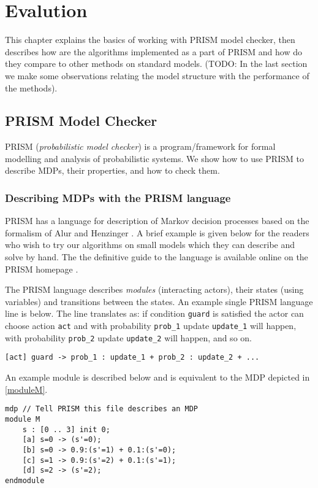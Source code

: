 \chapter{Evalution}
\label{ch_evaluation}

This chapter explains the basics of working with PRISM model checker,
then describes how are the algorithms implemented as a part of PRISM and
how do they compare to other methods on standard models.
(TODO: In the last section we make some observations relating the model
structure with the performance of the methods).

\section{PRISM Model Checker}

PRISM \parencite{prism}
({\em probabilistic model checker}) is a program/framework
for formal modelling and analysis of probabilistic systems.
We show how to use PRISM to describe MDPs, their properties,
and how to check them.

\subsection*{Describing MDPs with the PRISM language}
PRISM has a language for description of Markov decision processes
based on the formalism of Alur and Henzinger \parencite{ReactiveModules}.
A brief example is given below for the readers who wish to try our
algorithms on small models which they can describe and solve by hand.
The the definitive guide to the language is available online on the
PRISM homepage \parencite{prism_lang}.

The PRISM language describes {\em modules} (interacting actors),
their states (using variables) and transitions between the states.
An example single PRISM language line is below. The line translates as:
if condition \verb|guard| is satisfied the actor can choose action \verb|act|
and
with probability \verb|prob_1| update \verb|update_1| will happen,
with probability \verb|prob_2| update \verb|update_2| will happen,
and so on.

\begin{verbatim}
[act] guard -> prob_1 : update_1 + prob_2 : update_2 + ...
\end{verbatim}

An example module is described below and is equivalent to the MDP
depicted in \autoref{moduleM}.

\smallskip
\begin{verbatim}
mdp // Tell PRISM this file describes an MDP
module M
    s : [0 .. 3] init 0;
    [a] s=0 -> (s'=0);
    [b] s=0 -> 0.9:(s'=1) + 0.1:(s'=0);
    [c] s=1 -> 0.9:(s'=2) + 0.1:(s'=1);
    [d] s=2 -> (s'=2);
endmodule
\end{verbatim}
\smallskip

